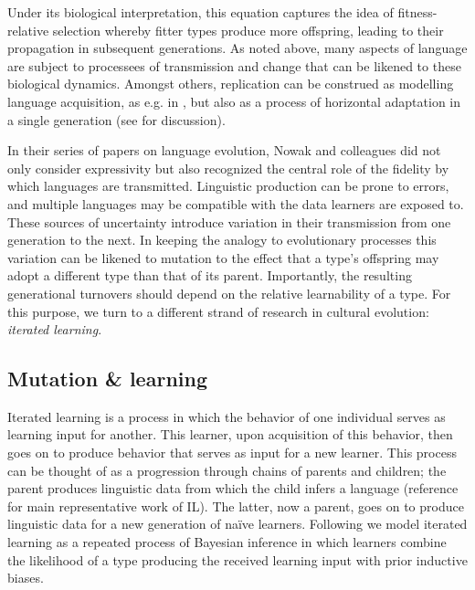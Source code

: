 \documentclass[a4paper]{article}
\newcommand{\hl}[1]{\textcolor[rgb]{.8,.33,.0}{#1}}%
\begin{document}
Under its biological interpretation, this equation captures the idea of fitness-relative selection whereby fitter types produce more offspring, leading to their propagation in subsequent generations. As noted above, many aspects of language are subject to processees of transmission and change that can be likened to these biological dynamics. Amongst others, replication can be construed as modelling language acquisition, as e.g. in \citealt{nowak+etal:2002}, but also as a process of horizontal adaptation in a single generation (see \citealt[\S3.3]{benz+etal:2005b} for discussion).

In their series of papers on language evolution, Nowak and colleagues did not only consider expressivity but also recognized the central role of the fidelity by which languages are transmitted. Linguistic production can be prone to errors, and multiple languages may be compatible with the data learners are exposed to. These sources of uncertainty introduce variation in their transmission from one generation to the next. In keeping the analogy to evolutionary processes this variation can be likened to mutation to the effect that a type's offspring may adopt a different type than that of its parent. Importantly, the resulting generational turnovers should depend on the relative learnability of a type. For this purpose, we turn to a different strand of research in cultural evolution: {\em iterated learning}. 


\subsection{Mutation \& learning}\label{sec:learnability}
Iterated learning is a process in which the behavior of one individual serves as learning input for another. This learner, upon acquisition of this behavior, then goes on to produce behavior that serves as input for a new learner. This process can be thought of as a progression through chains of parents and children; the parent produces linguistic data from which the child infers a language (\hl{reference for main representative work of IL}). The latter, now a parent, goes on to produce linguistic data for a new generation of na\"ive learners. Following \citet{griffiths+kalish:2007} we model iterated learning as a repeated process of Bayesian inference in which learners combine the likelihood of a type producing the received learning input with prior inductive biases. 
\end{document}
